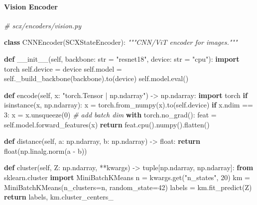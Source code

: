 \documentclass[
  12pt,
]{ctexart}
\newenvironment{Shaded}{}{}
\newcommand{\BuiltInTok}[1]{\textcolor[rgb]{0.00,0.50,0.00}{#1}}
\newcommand{\CommentTok}[1]{\textcolor[rgb]{0.38,0.63,0.69}{\textit{#1}}}
\newcommand{\ControlFlowTok}[1]{\textcolor[rgb]{0.00,0.44,0.13}{\textbf{#1}}}
\newcommand{\DecValTok}[1]{\textcolor[rgb]{0.25,0.63,0.44}{#1}}
\newcommand{\FunctionTok}[1]{\textcolor[rgb]{0.02,0.16,0.49}{#1}}
\newcommand{\ImportTok}[1]{\textcolor[rgb]{0.00,0.50,0.00}{\textbf{#1}}}
\newcommand{\KeywordTok}[1]{\textcolor[rgb]{0.00,0.44,0.13}{\textbf{#1}}}
\newcommand{\NormalTok}[1]{#1}
\newcommand{\OperatorTok}[1]{\textcolor[rgb]{0.40,0.40,0.40}{#1}}
\newcommand{\StringTok}[1]{\textcolor[rgb]{0.25,0.44,0.63}{#1}}
\newcommand{\VariableTok}[1]{\textcolor[rgb]{0.10,0.09,0.49}{#1}}
\begin{document}
\paragraph{Vision Encoder}\label{vision-encoder}

\begin{Shaded}
\begin{Highlighting}[]
\CommentTok{\# scx/encoders/vision.py}

\KeywordTok{class}\NormalTok{ CNNEncoder(SCXStateEncoder):}
    \CommentTok{"""CNN/ViT encoder for images."""}

    \KeywordTok{def} \FunctionTok{\_\_init\_\_}\NormalTok{(}\VariableTok{self}\NormalTok{, backbone: }\BuiltInTok{str} \OperatorTok{=} \StringTok{"resnet18"}\NormalTok{, device: }\BuiltInTok{str} \OperatorTok{=} \StringTok{"cpu"}\NormalTok{):}
        \ImportTok{import}\NormalTok{ torch}
        \VariableTok{self}\NormalTok{.device }\OperatorTok{=}\NormalTok{ device}
        \VariableTok{self}\NormalTok{.model }\OperatorTok{=} \VariableTok{self}\NormalTok{.\_build\_backbone(backbone).to(device)}
        \VariableTok{self}\NormalTok{.model.}\BuiltInTok{eval}\NormalTok{()}

    \KeywordTok{def}\NormalTok{ encode(}\VariableTok{self}\NormalTok{, x: }\StringTok{"torch.Tensor | np.ndarray"}\NormalTok{) }\OperatorTok{{-}\textgreater{}}\NormalTok{ np.ndarray:}
        \ImportTok{import}\NormalTok{ torch}
        \ControlFlowTok{if} \BuiltInTok{isinstance}\NormalTok{(x, np.ndarray):}
\NormalTok{            x }\OperatorTok{=}\NormalTok{ torch.from\_numpy(x).to(}\VariableTok{self}\NormalTok{.device)}
        \ControlFlowTok{if}\NormalTok{ x.ndim }\OperatorTok{==} \DecValTok{3}\NormalTok{:}
\NormalTok{            x }\OperatorTok{=}\NormalTok{ x.unsqueeze(}\DecValTok{0}\NormalTok{)  }\CommentTok{\# add batch dim}
        \ControlFlowTok{with}\NormalTok{ torch.no\_grad():}
\NormalTok{            feat }\OperatorTok{=} \VariableTok{self}\NormalTok{.model.forward\_features(x)}
        \ControlFlowTok{return}\NormalTok{ feat.cpu().numpy().flatten()}

    \KeywordTok{def}\NormalTok{ distance(}\VariableTok{self}\NormalTok{, a: np.ndarray, b: np.ndarray) }\OperatorTok{{-}\textgreater{}} \BuiltInTok{float}\NormalTok{:}
        \ControlFlowTok{return} \BuiltInTok{float}\NormalTok{(np.linalg.norm(a }\OperatorTok{{-}}\NormalTok{ b))}

    \KeywordTok{def}\NormalTok{ cluster(}\VariableTok{self}\NormalTok{, Z: np.ndarray, }\OperatorTok{**}\NormalTok{kwargs) }\OperatorTok{{-}\textgreater{}} \BuiltInTok{tuple}\NormalTok{[np.ndarray, np.ndarray]:}
        \ImportTok{from}\NormalTok{ sklearn.cluster }\ImportTok{import}\NormalTok{ MiniBatchKMeans}
\NormalTok{        n }\OperatorTok{=}\NormalTok{ kwargs.get(}\StringTok{"n\_states"}\NormalTok{, }\DecValTok{20}\NormalTok{)}
\NormalTok{        km }\OperatorTok{=}\NormalTok{ MiniBatchKMeans(n\_clusters}\OperatorTok{=}\NormalTok{n, random\_state}\OperatorTok{=}\DecValTok{42}\NormalTok{)}
\NormalTok{        labels }\OperatorTok{=}\NormalTok{ km.fit\_predict(Z)}
        \ControlFlowTok{return}\NormalTok{ labels, km.cluster\_centers\_}
\end{Highlighting}
\end{Shaded}
\end{document}
